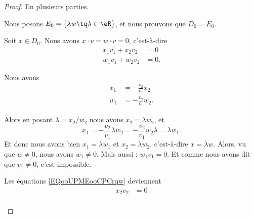 \begin{proof}
	En plusieurs parties.
	\begin{subproof}
		Nous posons \( E_0=\{ \lambda w\tq \lambda\in \eR \}\), et nous prouvons que \( D_0=E_0\).
		\begin{subproof}
			\spitem[\( D_0\subset E_0\)]
			Soit \( x\in D_0\). Nous avons \( x\cdot v=w\cdot v=0\), c'est-à-dire
			\begin{subequations}		\label{EQooUPMEooCPCrqw}
				\begin{align}
					x_1v_1+x_2v_2 & =0   \\
					w_1v_1+w_2v_2 & = 0.
				\end{align}
			\end{subequations}
			\begin{subproof}
				\spitem[Si \( v_1\neq 0\)]
				Nous avons
				\begin{subequations}
					\begin{align}
						x_1 & =-\frac{ v_2 }{ v_1 }x_2  \\
						w_1 & =-\frac{ v_2 }{ v_1 }w_2.
					\end{align}
				\end{subequations}
				\begin{subproof}
					\spitem[Si \( w_2\neq 0\)]
					Alors en posant \( \lambda=x_2/w_2\) nous avons \( x_2=\lambda w_2\), et
					\begin{equation}
						x_1=-\frac{ v_2 }{ v_1 }\lambda w_2=-\frac{ v_2 }{ v_1 }w_2\lambda=\lambda w_1.
					\end{equation}
					Et donc nous avons bien \( x_1=\lambda w_1\) et \( x_2=\lambda w_2\), c'est-à-dire \( x=\lambda w\).
					\spitem[Si \( w_2= 0\)]
					Alors, vu que \( w\neq 0\), nous avons \( w_1\neq 0\). Mais aussi : \( w_1v_1=0\). Et comme nous avons dit que \( v_1\neq 0\), c'est impossible.
				\end{subproof}
				\spitem[Si \( v_1= 0\)]
				Les équations \eqref{EQooUPMEooCPCrqw} deviennent
				\begin{subequations}
					\begin{align}
						x_2v_2 & =0 \\

\end{align}
\end{subequations}
\end{subproof}
\end{subproof}
\end{subproof}
\end{proof}
